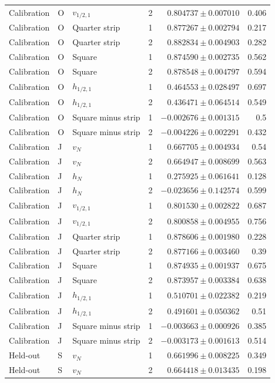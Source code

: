 {\begin{longtable}{lllrrr}
Calibration & O & $v_{1/2,1}$ & 2 & $0.804737\pm0.007010$ & 0.406\\
Calibration & O & Quarter strip & 1 & $0.877267\pm0.002794$ & 0.217\\
Calibration & O & Quarter strip & 2 & $0.882834\pm0.004903$ & 0.282\\
Calibration & O & Square & 1 & $0.874590\pm0.002735$ & 0.562\\
Calibration & O & Square & 2 & $0.878548\pm0.004797$ & 0.594\\
Calibration & O & $h_{1/2,1}$ & 1 & $0.464553\pm0.028497$ & 0.697\\
Calibration & O & $h_{1/2,1}$ & 2 & $0.436471\pm0.064514$ & 0.549\\
Calibration & O & Square minus strip & 1 & $-0.002676\pm0.001315$ & 0.5\\
Calibration & O & Square minus strip & 2 & $-0.004226\pm0.002291$ & 0.432\\
Calibration & J & $v_N$ & 1 & $0.667705\pm0.004934$ & 0.54\\
Calibration & J & $v_N$ & 2 & $0.664947\pm0.008699$ & 0.563\\
Calibration & J & $h_N$ & 1 & $0.275925\pm0.061641$ & 0.128\\
Calibration & J & $h_N$ & 2 & $-0.023656\pm0.142574$ & 0.599\\
Calibration & J & $v_{1/2,1}$ & 1 & $0.801530\pm0.002822$ & 0.687\\
Calibration & J & $v_{1/2,1}$ & 2 & $0.800858\pm0.004955$ & 0.756\\
Calibration & J & Quarter strip & 1 & $0.878606\pm0.001980$ & 0.228\\
Calibration & J & Quarter strip & 2 & $0.877166\pm0.003460$ & 0.39\\
Calibration & J & Square & 1 & $0.874935\pm0.001937$ & 0.675\\
Calibration & J & Square & 2 & $0.873957\pm0.003384$ & 0.638\\
Calibration & J & $h_{1/2,1}$ & 1 & $0.510701\pm0.022382$ & 0.219\\
Calibration & J & $h_{1/2,1}$ & 2 & $0.491601\pm0.050362$ & 0.51\\
Calibration & J & Square minus strip & 1 & $-0.003663\pm0.000926$ & 0.385\\
Calibration & J & Square minus strip & 2 & $-0.003173\pm0.001613$ & 0.514\\
Held-out & S & $v_N$ & 1 & $0.661996\pm0.008225$ & 0.349\\
Held-out & S & $v_N$ & 2 & $0.664418\pm0.013435$ & 0.198\\

\end{longtable}}
